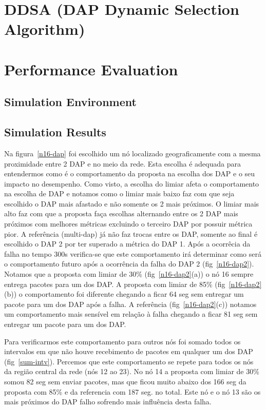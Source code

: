 \documentclass[conference]{IEEEtran}
\begin{document}
\section{DDSA (DAP Dynamic Selection Algorithm)}


\section{Performance Evaluation}

\subsection{Simulation Environment}  

\subsection{Simulation Results}

Na figura~\ref{n16-dap} foi escolhido um nó localizado geograficamente com a mesma proximidade entre 2 DAP e no meio da rede. Esta escolha é adequada para entendermos como é o comportamento da proposta na escolha dos DAP e o seu impacto no desempenho. Como visto, a escolha do limiar afeta o comportamento na escolha de DAP e notamos como o limiar mais baixo faz com que seja escolhido o DAP mais afastado e não somente os 2 mais próximos. O limiar mais alto faz com que a proposta faça escolhas alternando entre os 2 DAP mais próximos  com melhores métricas excluindo o terceiro DAP por possuir métrica pior. A referência (multi-dap) já não faz trocas entre os DAP, somente ao final é escolhido o DAP 2 por ter superado a métrica do DAP 1. Após a ocorrêcia da falha no tempo 300s verifica-se que este comportamento irá determinar como será o comportamento futuro após a ocorrência da falha do DAP 2 (fig~\ref{n16-dap2}). Notamos que a proposta com limiar de 30\% (fig~\ref{n16-dap2}(a)) o nó 16 sempre  entrega pacotes para um dos DAP. A proposta com limiar de 85\% (fig~\ref{n16-dap2}(b)) o comportamento foi diferente chegando a ficar 64 seg sem entregar um pacote para um dos DAP após a falha. A referência (fig~\ref{n16-dap2}(c)) notamos um comportamento mais sensível em relação à falha chegando a ficar 81 seg sem entregar um pacote para um dos DAP.

Para verificarmos este comportamento para outros nós foi somado todos os intervalos em que não houve recebimento de pacotes em qualquer um dos DAP (fig~\ref{sum-intv}). Percemos que este comportamento se repete para todos os nós da região central da rede (nós 12 ao 23). No nó 14 a proposta com limiar de 30\% somou 82 seg sem enviar pacotes, mas que ficou muito abaixo dos 166 seg da proposta com 85\% e da referencia com 187 seg. no total. Este nó e o nó 13 são os mais próximos do DAP  falho sofrendo mais influência desta falha. 
\end{document}
